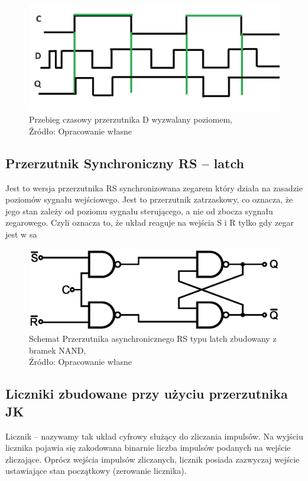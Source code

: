\documentclass{article}
\begin{document}
      \begin{figure}[!ht]
          \centering
          \includegraphics[scale=0.25]{grafiki/latch.jpg}
          \caption{Przebieg czasowy przerzutnika D wyzwalany poziomem,
          \\Źródło: Opracowanie własne}
      \end{figure}

    \subsection{Przerzutnik Synchroniczny RS -- latch}
      Jest to wersja przerzutnika RS synchronizowana zegarem który działa na zasadzie poziomów sygnału wejściowego. Jest to przerzutnik zatrzaskowy, co oznacza, że jego stan zależy od poziomu sygnału sterującego, a nie od zbocza sygnału zegarowego. Czyli oznacza to, że układ reaguje na wejścia S i R tylko gdy zegar jest w sa
    \begin{figure}[!ht]
      \centering
      \includegraphics[scale=0.55]{grafiki/SR_NAND_Async_latch.eps}
      \caption{Schemat Przerzutnika asynchronicznego RS typu latch zbudowany z bramek NAND,
      \\Źródło: Opracowanie własne}
    \end{figure}

    \subsection{Liczniki zbudowane przy użyciu przerzutnika JK}
      Licznik -- nazywamy tak układ cyfrowy służący do zliczania impulsów. Na wyjściu licznika pojawia się zakodowana binarnie liczba impulsów podanych na wejście zliczające. Oprócz wejścia impulsów zliczanych, licznik posiada zazwyczaj wejście ustawiające stan początkowy (zerowanie licznika).
\end{document}
